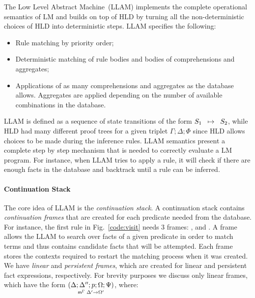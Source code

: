 The Low Level Abstract Machine~(LLAM) implements the complete operational
semantics of LM and builds on top of HLD by turning all the non-deterministic
choices of HLD into deterministic steps. LLAM specifies the following:

\begin{itemize}

   \item Rule matching by priority order;

   \item Deterministic matching of rule bodies and bodies of comprehensions and
      aggregates;

   \item Applications of as many comprehensions and aggregates as the database
      allows. Aggregates are applied depending on the number of available
      combinations in the database.

\end{itemize}

LLAM is defined as a sequence of state transitions of the form $\trans{S_1}{S_2}$,
while HLD had many different proof trees for a given triplet $\Gamma; \Delta; \Phi$
since HLD allows choices to be made during the inference rules.
LLAM semantics present a complete step by step mechanism that is needed to
correctly evaluate a LM program. For instance, when LLAM tries to apply a rule,
it will check if there are enough facts in the database and backtrack until a
rule can be inferred.

\paragraph{Continuation Stack} The core idea of LLAM is the \emph{continuation
stack}. A continuation stack contains \emph{continuation frames} that are
created for each predicate needed from the database. For instance, the first
rule in Fig.~\ref{code:visit} needs 3 frames: ,  and
. A frame allows the LLAM to search over facts of a given
predicate in order to match terms and thus contains candidate facts
that will be attempted. Each frame stores the contexts required to restart the
matching process when it was created. We have \emph{linear} and \emph{persistent
frames}, which are created for linear and persistent fact expressions,
respectively. For brevity purposes we discuss only linear frames, which have the
form $\lframe{\Delta}{\Delta''}{p}{\Omega; \Psi}{\Delta'}{\Omega'}$, where:


